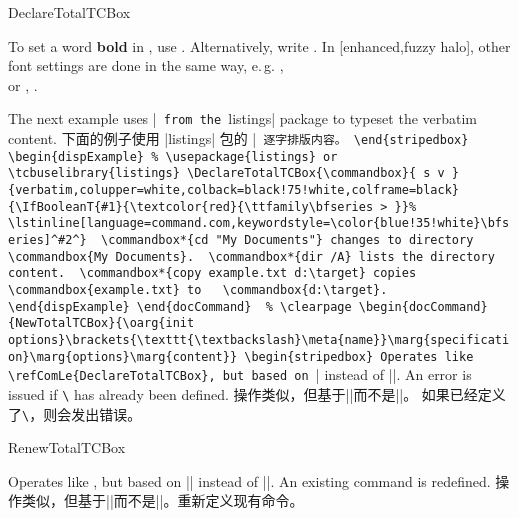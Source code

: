 \begin{docCommand}{DeclareTotalTCBox}{}
\begin{dispExample}
To set a word \textbf{bold} in \myverb{\LaTeX}, use
. Alternatively, write
.
In \myverb[blue]{\LaTeX}[enhanced,fuzzy halo], other font settings are
done in the same way, e.\,g. \myverb{\textit}, \myverb{\itshape}\\
or \myverb[brown]{\texttt}, \myverb[brown]{\ttfamily}.
\end{dispExample}

\begin{stripedbox}
The next example uses |\lstinline| from the |listings| package to
typeset the verbatim content.
\tcblower
下面的例子使用 |listings| 包的 |\lstinline| 逐字排版内容。
\end{stripedbox}


\begin{dispExample}
% \usepackage{listings} or \tcbuselibrary{listings}
\DeclareTotalTCBox{\commandbox}{ s v }
{verbatim,colupper=white,colback=black!75!white,colframe=black}
{\IfBooleanT{#1}{\textcolor{red}{\ttfamily\bfseries > }}%
  \lstinline[language=command.com,keywordstyle=\color{blue!35!white}\bfseries]^#2^}

\commandbox*{cd "My Documents"} changes to directory \commandbox{My Documents}.

\commandbox*{dir /A} lists the directory content.

\commandbox*{copy example.txt d:\target} copies \commandbox{example.txt} to
  \commandbox{d:\target}.
\end{dispExample}
\end{docCommand}

% \clearpage
\begin{docCommand}{NewTotalTCBox}{\oarg{init options}\brackets{\texttt{\textbackslash}\meta{name}}\marg{specification}\marg{options}\marg{content}}
\begin{stripedbox}
Operates like \refComLe{DeclareTotalTCBox}, but based on |\NewDocumentCommand| instead of |\DeclareDocumentCommand|.
An error is issued if \texttt{\textbackslash} has already been defined.
\tcblower
操作类似，但基于|\NewDocumentCommand|而不是|\DeclareDocumentCommand|。%
如果已经定义了\texttt{\textbackslash}，则会发出错误。
\end{stripedbox}
\end{docCommand}

\begin{docCommand}{RenewTotalTCBox}{}
\begin{stripedbox}
Operates like , but based on |\RenewDocumentCommand| instead of |\DeclareDocumentCommand|.
An existing command is redefined.
\tcblower
操作类似，但基于|\RenewDocumentCommand|而不是|\DeclareDocumentCommand|。重新定义现有命令。
\end{stripedbox}
\end{docCommand}

